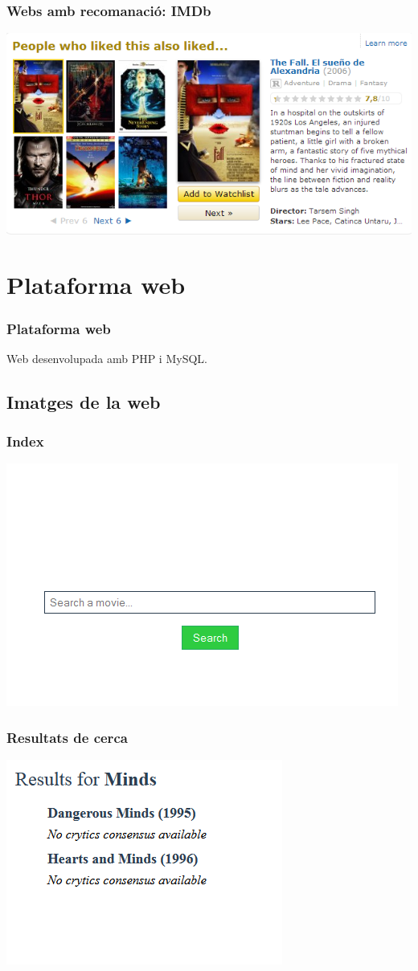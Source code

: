 \documentclass[catalan]{beamer}
\begin{document}
\begin{frame}
\frametitle{Webs amb recomanació: IMDb}
\includegraphics[width=\textwidth]{figs/imdb-recommendations}
\end{frame}

\section{Plataforma web}

\begin{frame}
\frametitle{Plataforma web}
Web desenvolupada amb PHP i MySQL.
\end{frame}

\subsection{Imatges de la web}
\begin{frame}
\frametitle{Index}
\begin{center}
\includegraphics[width=.7\textwidth]{figs/homepage}
\end{center}
\end{frame}

\begin{frame}
\frametitle{Resultats de cerca}
\begin{center}
\includegraphics[width=.6\textwidth]{figs/resultats-busqueda}
\end{center}
\end{frame}
\end{document}
